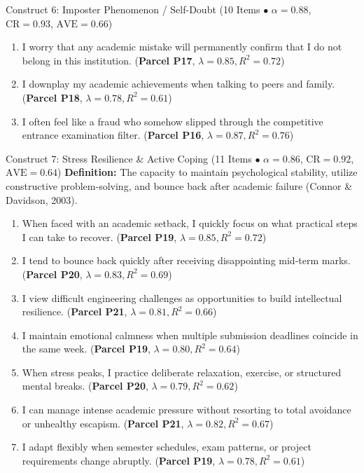 \documentclass[10pt,a4paper]{article}
\begin{document}
\begin{constructbox}{Construct 6: Imposter Phenomenon / Self-Doubt (10 Items $\bullet$ $\alpha = 0.88$, $\text{CR} = 0.93$, $\text{AVE} = 0.66$)}
\begin{enumerate}[label=\textbf{Q\arabic*.}, leftmargin=2.5em, itemsep=2pt, resume]
  \item I worry that any academic mistake will permanently confirm that I do not belong in this institution. \hfill (\textbf{Parcel P17}, $\lambda = 0.85, R^2 = 0.72$)
  \item I downplay my academic achievements when talking to peers and family. \hfill (\textbf{Parcel P18}, $\lambda = 0.78, R^2 = 0.61$)
  \item I often feel like a fraud who somehow slipped through the competitive entrance examination filter. \hfill (\textbf{Parcel P16}, $\lambda = 0.87, R^2 = 0.76$)
\end{enumerate}
\end{constructbox}

\vspace{0.2cm}
\begin{constructbox}{Construct 7: Stress Resilience \& Active Coping (11 Items $\bullet$ $\alpha = 0.86$, $\text{CR} = 0.92$, $\text{AVE} = 0.64$)}
\textbf{Definition:} The capacity to maintain psychological stability, utilize constructive problem-solving, and bounce back after academic failure (Connor \& Davidson, 2003).
\begin{enumerate}[label=\textbf{Q\arabic*.}, leftmargin=2.5em, itemsep=2pt, resume]
  \item When faced with an academic setback, I quickly focus on what practical steps I can take to recover. \hfill (\textbf{Parcel P19}, $\lambda = 0.85, R^2 = 0.72$)
  \item I tend to bounce back quickly after receiving disappointing mid-term marks. \hfill (\textbf{Parcel P20}, $\lambda = 0.83, R^2 = 0.69$)
  \item I view difficult engineering challenges as opportunities to build intellectual resilience. \hfill (\textbf{Parcel P21}, $\lambda = 0.81, R^2 = 0.66$)
  \item I maintain emotional calmness when multiple submission deadlines coincide in the same week. \hfill (\textbf{Parcel P19}, $\lambda = 0.80, R^2 = 0.64$)
  \item When stress peaks, I practice deliberate relaxation, exercise, or structured mental breaks. \hfill (\textbf{Parcel P20}, $\lambda = 0.79, R^2 = 0.62$)
  \item I can manage intense academic pressure without resorting to total avoidance or unhealthy escapism. \hfill (\textbf{Parcel P21}, $\lambda = 0.82, R^2 = 0.67$)
  \item I adapt flexibly when semester schedules, exam patterns, or project requirements change abruptly. \hfill (\textbf{Parcel P19}, $\lambda = 0.78, R^2 = 0.61$)

\end{enumerate}
\end{constructbox}
\end{document}

